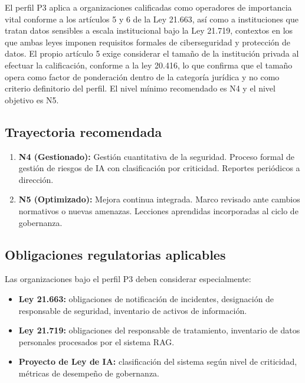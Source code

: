 El perfil P3 aplica a organizaciones calificadas como operadores de importancia vital conforme a los artículos 5 y 6 de la Ley 21.663, así como a instituciones que tratan datos sensibles a escala institucional bajo la Ley 21.719, contextos en los que ambas leyes imponen requisitos formales de ciberseguridad y protección de datos. El propio artículo 5 exige considerar el tamaño de la institución privada al efectuar la calificación, conforme a la ley 20.416, lo que confirma que el tamaño opera como factor de ponderación dentro de la categoría jurídica y no como criterio definitorio del perfil. El nivel mínimo recomendado es N4 y el nivel objetivo es N5.

\subsection{Trayectoria recomendada}

\begin{enumerate}[leftmargin=2em]
  \item \textbf{N4 (Gestionado):} Gestión cuantitativa de la seguridad. Proceso formal de gestión de riesgos de IA con clasificación por criticidad. Reportes periódicos a dirección.
  \item \textbf{N5 (Optimizado):} Mejora continua integrada. Marco revisado ante cambios normativos o nuevas amenazas. Lecciones aprendidas incorporadas al ciclo de gobernanza.
\end{enumerate}

\subsection{Obligaciones regulatorias aplicables}

\begin{infobox}
  Las organizaciones bajo el perfil P3 deben considerar especialmente:

  \begin{itemize}[leftmargin=2em]
    \item \textbf{Ley 21.663:} obligaciones de notificación de incidentes, designación de responsable de seguridad, inventario de activos de información.
    \item \textbf{Ley 21.719:} obligaciones del responsable de tratamiento, inventario de datos personales procesados por el sistema RAG.
    \item \textbf{Proyecto de Ley de IA:} clasificación del sistema según nivel de criticidad, métricas de desempeño de gobernanza.
  \end{itemize}
\end{infobox}

